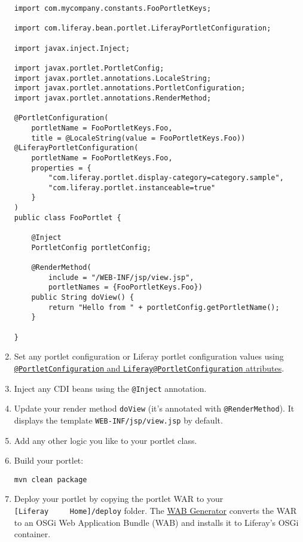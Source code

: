 \begin{enumerate}
\begin{verbatim}
import com.mycompany.constants.FooPortletKeys;

import com.liferay.bean.portlet.LiferayPortletConfiguration;

import javax.inject.Inject;

import javax.portlet.PortletConfig;
import javax.portlet.annotations.LocaleString;
import javax.portlet.annotations.PortletConfiguration;
import javax.portlet.annotations.RenderMethod;

@PortletConfiguration(
    portletName = FooPortletKeys.Foo,
    title = @LocaleString(value = FooPortletKeys.Foo))
@LiferayPortletConfiguration(
    portletName = FooPortletKeys.Foo,
    properties = {
        "com.liferay.portlet.display-category=category.sample",
        "com.liferay.portlet.instanceable=true"
    }
)
public class FooPortlet {

    @Inject
    PortletConfig portletConfig;

    @RenderMethod(
        include = "/WEB-INF/jsp/view.jsp",
        portletNames = {FooPortletKeys.Foo})
    public String doView() {
        return "Hello from " + portletConfig.getPortletName();
    }

}
\end{verbatim}
\item
  Set any portlet configuration or Liferay portlet configuration values
  using
  \href{/docs/7-2/reference/-/knowledge_base/r/portlet-descriptor-to-osgi-service-property-map}{\texttt{@PortletConfiguration}
  and \texttt{Liferay@PortletConfiguration} attributes}.
\item
  Inject any CDI beans using the \texttt{@Inject} annotation.
\item
  Update your render method \texttt{doView} (it's annotated with
  \texttt{@RenderMethod}). It displays the template
  \texttt{WEB-INF/jsp/view.jsp} by default.
\item
  Add any other logic you like to your portlet class.
\item
  Build your portlet:

\begin{verbatim}
mvn clean package
\end{verbatim}
\item
  Deploy your portlet by copying the portlet WAR to your
  \texttt{{[}Liferay\ \ \ \ \ Home{]}/deploy} folder. The
  \href{/docs/7-2/customization/-/knowledge_base/c/deploying-wars-wab-generator}{WAB
  Generator} converts the WAR to an OSGi Web Application Bundle (WAB)
  and installs it to Liferay's OSGi container.
\end{enumerate}

